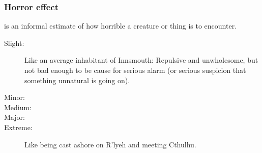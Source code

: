 \subsubsection{Horror effect}
 is an informal estimate of how horrible a creature or thing is to encounter. 

\begin{description}
	\item[Slight:] Like an average inhabitant of Innsmouth: Repulsive and unwholesome, but not bad enough to be cause for serious alarm (or serious suspicion that something unnatural is going on). 
	\item[Minor:] 
	\item[Medium:] 
	\item[Major:] 
	\item[Extreme:] Like being cast ashore on R'lyeh and meeting Cthulhu. 
\end{description}




